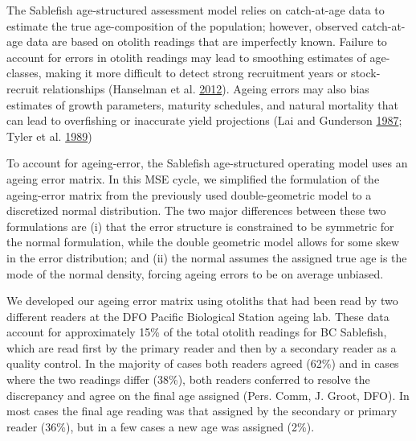 \documentclass[11pt]{book}
\begin{document}
The Sablefish age-structured assessment model relies on catch-at-age data to estimate the true age-composition of the population; however, observed catch-at-age data are based on otolith readings that are imperfectly known. Failure to account for errors in otolith readings may lead to smoothing estimates of age-classes, making it more difficult to detect strong recruitment years or stock-recruit relationships (Hanselman et al. \protect\hyperlink{ref-hanselman2012statistical}{2012}). Ageing errors may also bias estimates of growth parameters, maturity schedules, and natural mortality that can lead to overfishing or inaccurate yield projections (Lai and Gunderson \protect\hyperlink{ref-lai1987effects}{1987}; Tyler et al. \protect\hyperlink{ref-tyler1989implications}{1989})

To account for ageing-error, the Sablefish age-structured operating model uses an ageing error matrix. In this MSE cycle, we simplified the formulation of the ageing-error matrix from the previously used double-geometric model to a discretized normal distribution. The two major differences between these two formulations are (i) that the error structure is constrained to be symmetric for the normal formulation, while the double geometric model allows for some skew in the error distribution; and (ii) the normal assumes the assigned true age is the mode of the normal density, forcing ageing errors to be on average unbiased.

We developed our ageing error matrix using otoliths that had been read by two different readers at the DFO Pacific Biological Station ageing lab. These data account for approximately 15\% of the total otolith readings for BC Sablefish, which are read first by the primary reader and then by a secondary reader as a quality control. In the majority of cases both readers agreed (62\%) and in cases where the two readings differ (38\%), both readers conferred to resolve the discrepancy and agree on the final age assigned (Pers. Comm, J. Groot, DFO). In most cases the final age reading was that assigned by the secondary or primary reader (36\%), but in a few cases a new age was assigned (2\%).
\end{document}
